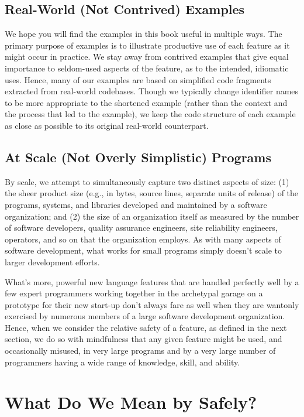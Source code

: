\subsection{Real-World (Not Contrived) Examples}

We hope you will find the examples in this book useful in multiple ways. The primary purpose of examples is to illustrate productive use of each feature as it might occur in practice. We stay away from contrived examples that give equal importance to seldom-used aspects of the feature, as to the intended, idiomatic uses. Hence, many of our examples are based on simplified code fragments extracted from real-world codebases. Though we typically change identifier names to be more appropriate to the shortened example (rather than the context and the process that led to the example), we keep the code structure of each example as close as possible to its original real-world counterpart.

\subsection{At Scale (Not Overly Simplistic) Programs}

By scale, we attempt to simultaneously capture two distinct aspects of size: (1) the sheer product size (e.g., in bytes, source lines, separate units of release) of the programs, systems, and libraries developed and maintained by a software organization; and (2) the size of an organization itself as measured by the number of software developers, quality assurance engineers, site reliability engineers, operators, and so on that the organization employs. As with many aspects of software development, what works for small programs simply doesn’t scale to larger development efforts.

What’s more, powerful new language features that are handled perfectly well by a few expert programmers working together in the archetypal garage on a prototype for their new start-up don't always fare as well when they are wantonly exercised by numerous members of a large software development organization. Hence, when we consider the relative safety of a feature, as defined in the next section, we do so with mindfulness that any given feature might be used, and occasionally misused, in very large programs and by a very large number of programmers having a wide range of knowledge, skill, and ability.

\section[{What Do We Mean by {\sffamily\itshape Safely}?}]{What Do We Mean by {\sfbsectionitalRomeo Safely}?}

